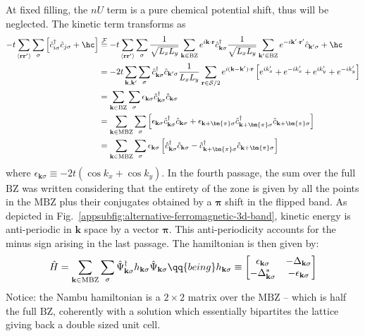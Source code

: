 At fixed filling, the $nU$ term is a pure chemical potential shift, thus will be neglected. The kinetic term transforms as
\[
\begin{aligned}
	-t \sum_{\langle \mathbf{r}\mathbf{r}' \rangle} \sum_\sigma \left[
		\hat c_{i\sigma}^\dagger \hat c_{j\sigma} + \hc
	\right] &\stackrel{\mathcal{F}}{=} -t \sum_{\langle \mathbf{r}\mathbf{r}' \rangle} \sum_\sigma \frac{1}{\sqrt{L_xL_y}} \sum_{\mathbf{k}\in\mathrm{BZ}} e^{i\mathbf{k}\cdot\mathbf{r}} \hat c_{\mathbf{k}\sigma}^\dagger \frac{1}{\sqrt{L_xL_y}} \sum_{\mathbf{k}'\in\mathrm{BZ}} e^{-i\mathbf{k}'\cdot\mathbf{r}'} \hat c_{\mathbf{k}'\sigma} +\hc \\
	&= -2t\sum_{\mathbf{k},\mathbf{k}'} \sum_\sigma \hat c_{\mathbf{k}\sigma}^\dagger \hat c_{\mathbf{k}'\sigma} \frac{1}{L_x L_y} \sum_{\mathbf{r}\in\mathcal{S}/2} e^{i(\mathbf{k}-\mathbf{k}')\cdot\mathbf{r}} \left[
		e^{i k'_x}+e^{-i k'_x} + e^{i k'_y}+e^{-i k'_y}
	\right]  \\
	&= \sum_{\mathbf{k} \in \mathrm{BZ}} \sum_\sigma \epsilon_{\mathbf{k}\sigma} \hat c_{\mathbf{k}\sigma}^\dagger \hat c_{\mathbf{k}\sigma} \\ 
	&= \sum_{\mathbf{k} \in \mathrm{MBZ}} \sum_\sigma \left[
		\epsilon_{\mathbf{k}\sigma} \hat c_{\mathbf{k}\sigma}^\dagger \hat c_{\mathbf{k}\sigma}
		+ \epsilon_{\mathbf{k}+\bm{\pi}\sigma} \hat c_{\mathbf{k}+\bm{\pi}\sigma}^\dagger \hat c_{\mathbf{k}+\bm{\pi}\sigma}
	\right] \\
	&= \sum_{\mathbf{k} \in \mathrm{MBZ}} \sum_\sigma \epsilon_{\mathbf{k}\sigma}
	\left[
		\hat c_{\mathbf{k}\sigma}^\dagger \hat c_{\mathbf{k}\sigma}
		- \hat c_{\mathbf{k}+\bm{\pi}\sigma}^\dagger \hat c_{\mathbf{k}+\bm{\pi}\sigma}
	\right] \\ 
\end{aligned}
\]
where $\epsilon_{\mathbf{k}\sigma} \equiv -2t ( \cos k_x + \cos k_y )$. In the fourth passage, the sum over the full $\mathrm{BZ}$ was written considering that the entirety of the zone is given by all the points in the $\mathrm{MBZ}$ plus their conjugates obtained by a $\bm{\pi}$ shift in the flipped band. As depicted in Fig.~\ref{appsubfig:alternative-ferromagnetic-3d-band}, kinetic energy is anti-periodic in $\mathbf{k}$ space by a vector $\bm{\pi}$. This anti-periodicity accounts for the minus sign arising in the last passage. The hamiltonian is then given by:
\begin{equation}\label{appeq:hubbard-bogoliubov-hamiltonian}
	\hat H = \sum_{\mathbf{k} \in \mathrm{MBZ}} \sum_\sigma \hat \Psi_{\mathbf{k}\sigma}^\dagger h_{\mathbf{k}\sigma} \hat \Psi_{\mathbf{k}\sigma}
	\qq{being}
	h_{\mathbf{k}\sigma} \equiv \begin{bmatrix}
		\epsilon_{\mathbf{k}\sigma} & -\Delta_{\mathbf{k}\sigma} \\
		-\Delta_{\mathbf{k}\sigma}^* & - \epsilon_{\mathbf{k}\sigma}
	\end{bmatrix}
\end{equation}
Notice: the Nambu hamiltonian is a $2\times2$ matrix over the $\mathrm{MBZ}$ -- which is half the full $\mathrm{BZ}$, coherently with a solution which essentially bipartites the lattice giving back a double sized unit cell.

